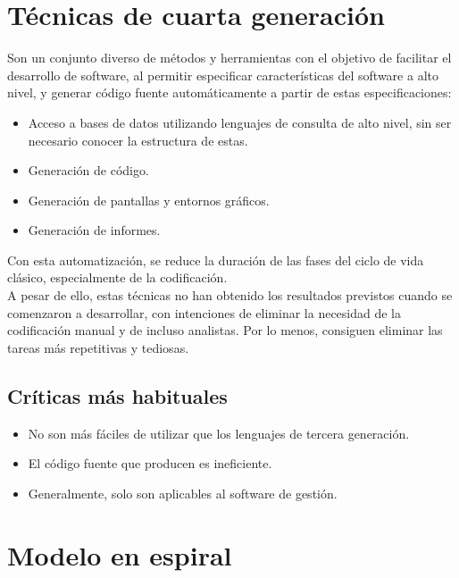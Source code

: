 \section{Técnicas de cuarta generación}

Son un conjunto diverso de métodos y herramientas con el objetivo de facilitar el desarrollo de software, al permitir especificar características del software a alto nivel, y generar código fuente automáticamente a partir de estas especificaciones:

\begin{itemize}
   \item Acceso a bases de datos utilizando lenguajes de consulta de alto nivel, sin ser necesario conocer la estructura de estas.
   \item Generación de código.
   \item Generación de pantallas y entornos gráficos.
   \item Generación de informes.
\end{itemize}

Con esta automatización, se reduce la duración de las fases del ciclo de vida clásico, especialmente de la codificación.\\

A pesar de ello, estas técnicas no han obtenido los resultados previstos cuando se comenzaron a desarrollar, con intenciones de eliminar la necesidad de la codificación manual y de incluso analistas. Por lo menos, consiguen eliminar las tareas más repetitivas y tediosas.

\subsection{Críticas más habituales}

\begin{itemize}
   \item No son más fáciles de utilizar que los lenguajes de tercera generación.
   \item El código fuente que producen es ineficiente.
   \item Generalmente, solo son aplicables al software de gestión.
\end{itemize}


\section{Modelo en espiral}

